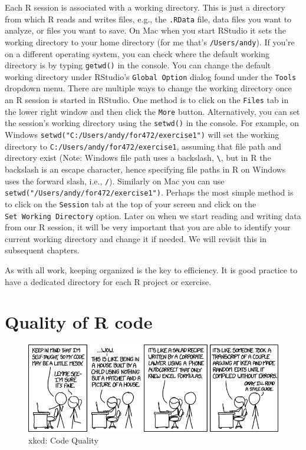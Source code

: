 \documentclass[]{krantz}
\theoremstyle{definition}
\theoremstyle{definition}
\theoremstyle{definition}
\theoremstyle{remark}
\begin{document}
Each R session is associated with a working directory. This is just a
directory from which R reads and writes files, e.g., the \texttt{.RData}
file, data files you want to analyze, or files you want to save. On Mac
when you start RStudio it sets the working directory to your home
directory (for me that's \texttt{/Users/andy}). If you're on a different
operating system, you can check where the default working directory is
by typing \texttt{getwd()} in the console. You can change the default
working directory under RStudio's \texttt{Global\ Option} dialog found
under the \texttt{Tools} dropdown menu. There are multiple ways to
change the working directory once an R session is started in RStudio.
One method is to click on the \texttt{Files} tab in the lower right
window and then click the \texttt{More} button. Alternatively, you can
set the session's working directory using the \texttt{setwd()} in the
console. For example, on Windows
\texttt{setwd("C:/Users/andy/for472/exercise1")} will set the working
directory to \texttt{C:/Users/andy/for472/exercise1}, assuming that file
path and directory exist (Note: Windows file path uses a backslash,
\texttt{\textbackslash{}}, but in R the backslash is an escape
character, hence specifying file paths in R on Windows uses the forward
slash, i.e., \texttt{/}). Similarly on Mac you can use
\texttt{setwd("/Users/andy/for472/exercise1")}. Perhaps the most simple
method is to click on the \texttt{Session} tab at the top of your screen
and click on the \texttt{Set\ Working\ Directory} option. Later on when
we start reading and writing data from our R session, it will be very
important that you are able to identify your current working directory
and change it if needed. We will revisit this in subsequent chapters.

As with all work, keeping organized is the key to efficiency. It is good
practice to have a dedicated directory for each R project or exercise.

\section{Quality of R code}\label{quality-of-r-code}

\begin{figure}
\includegraphics[width=10.28in]{02-introToR/02-images/code_quality} \caption{xkcd: Code Quality}\label{fig:comic}
\end{figure}
\end{document}
